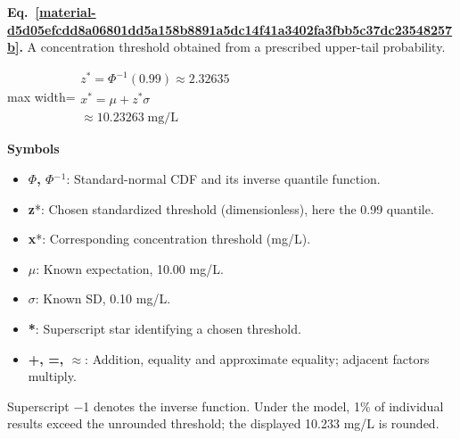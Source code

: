 \documentclass[11pt,a4paper]{article}
\begin{document}
\par\medskip
\noindent\begin{minipage}{\linewidth}
\label{material-d5d05efcdd8a06801dd5a158b8891a5dc14f41a3402fa3fbb5c37dc23548257b}
\noindent\textbf{Eq.~\ref*{material-d5d05efcdd8a06801dd5a158b8891a5dc14f41a3402fa3fbb5c37dc23548257b}.} A concentration threshold obtained from a prescribed upper-tail probability.\par\nopagebreak
\begin{center}\begin{adjustbox}{max width=\linewidth}$\displaystyle \begin{gathered}z^*=\Phi^{-1}(0.99)\approx2.32635\\x^*=\mu+z^*\sigma\\\approx10.23263\;\mathrm{mg/L}\end{gathered}$\end{adjustbox}\end{center}

\par\noindent\textbf{Symbols}

\begin{itemize}\setlength{\itemsep}{1pt}\setlength{\parsep}{0pt}
\item \textbf{\ensuremath{\Phi}, \ensuremath{\Phi}\ensuremath{{}^-}\ensuremath{{}^1}}: Standard-normal CDF and its inverse quantile function.
\item \textbf{z}*: Chosen standardized threshold (dimensionless), here the 0.99 quantile.
\item \textbf{x}*: Corresponding concentration threshold (mg/L).
\item \textbf{\ensuremath{\mu}}: Known expectation, 10.00 mg/L.
\item \textbf{\ensuremath{\sigma}}: Known SD, 0.10 mg/L.
\item \textbf{*}: Superscript star identifying a chosen threshold.
\item \textbf{+, =, \ensuremath{\approx}}: Addition, equality and approximate equality; adjacent factors multiply.
\end{itemize}

Superscript \ensuremath{-}1 denotes the inverse function. Under the model, 1\% of individual results exceed the unrounded threshold; the displayed 10.233 mg/L is rounded.

\end{minipage}\par
\medskip
\end{document}
